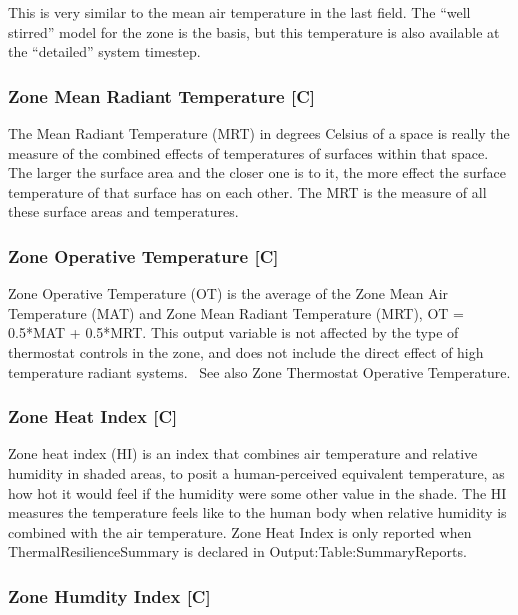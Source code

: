 This is very similar to the mean air temperature in the last field. The ``well stirred'' model for the zone is the basis, but this temperature is also available at the ``detailed'' system timestep.

\subsubsection{Zone Mean Radiant Temperature {[}C{]}}\label{zone-mean-radiant-temperature-c-1}

The Mean Radiant Temperature (MRT) in degrees Celsius of a space is really the measure of the combined effects of temperatures of surfaces within that space. The larger the surface area and the closer one is to it, the more effect the surface temperature of that surface has on each other. The MRT is the measure of all these surface areas and temperatures.

\subsubsection{Zone Operative Temperature {[}C{]}}\label{zone-operative-temperature-c-1}

Zone Operative Temperature (OT) is the average of the Zone Mean Air Temperature (MAT) and Zone Mean Radiant Temperature (MRT), OT = 0.5*MAT + 0.5*MRT. This output variable is not affected by the type of thermostat controls in the zone, and does not include the direct effect of high temperature radiant systems.~ See also Zone Thermostat Operative Temperature.

\subsubsection{Zone Heat Index {[}C{]}}\label{zone-heat-index-c-1}

Zone heat index (HI) is an index that combines air temperature and relative humidity in shaded areas, to posit a human-perceived equivalent temperature, as how hot it would feel if the humidity were some other value in the shade. The HI measures the temperature feels like to the human body when relative humidity is combined with the air temperature. Zone Heat Index is only reported when ThermalResilienceSummary is declared in Output:Table:SummaryReports.  


\subsubsection{Zone Humdity Index {[}C{]}}\label{zone-humidity-index-c-1}

